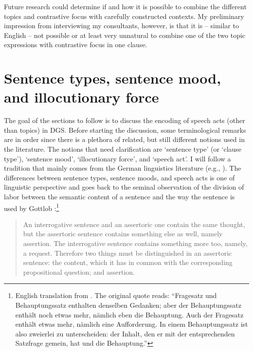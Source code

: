 \noindent Future research could determine if and how it is possible to combine the different topics and contrastive focus with carefully constructed contexts. My preliminary impression from interviewing my consultants, however, is that it is -- similar to English -- not possible or at least very unnatural to combine one of the two topic expressions with contrastive focus in one clause.  



\largerpage[-1]
\section{Sentence types, sentence mood, and illocutionary force}\label{sec:speechacts}
The goal of the sections to follow is to discuss the encoding of speech acts (other than topics) in DGS. Before starting the discussion, some terminological remarks are in order since there is a plethora of related, but still different notions used in the literature. The notions that need clarification are `sentence type' (or `clause type'), `sentence mood', `illocutionary force', and `speech act'. I will follow a tradition that mainly comes from the German linguistics literature (e.g., \citealt{meibauer1987probleme, zaefferer1987satztypen, grewendorf1991theorien, brandt1992satztyp, zaefferer2006types, gutzmann2015use}). The differences between sentence types, sentence moods, and speech acts is one of linguistic perspective and goes back to the seminal observation of the division of labor between the semantic content of a sentence and the way the sentence is used by Gottlob  \citet[62]{frege1918gedanke}:\footnote{English translation from \citet[329]{frege1997thought}. The original quote reads: ``Fragesatz und Behauptungssatz enthalten denselben Gedanken; aber der Behauptungssatz enthält noch etwas mehr, nämlich eben die Behauptung. Auch der Fragesatz enthält etwas mehr, nämlich eine Aufforderung. In einem Behauptungssatz ist also zweierlei zu unterscheiden: der Inhalt, den er mit der entsprechenden Satzfrage gemein, hat und die Behauptung.''}

\begin{quote}
An interrogative sentence and an assertoric one contain the same thought, but the assertoric sentence contains something else as well, namely assertion. The interrogative sentence contains something more too, namely, a request. Therefore two things must be distinguished in an assertoric sentence: the content, which it has in common with the corresponding propositional question; and assertion.
\end{quote}

